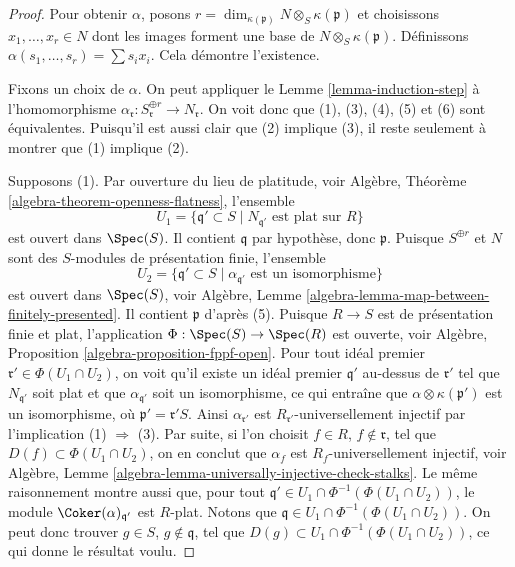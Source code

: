 \begin{proof}
Pour obtenir $\alpha$, posons
$r = \dim_{\kappa(\mathfrak p)} N \otimes_S \kappa(\mathfrak p)$ et choisissons
$x_1, \ldots, x_r \in N$ dont les images forment une base de
$N \otimes_S \kappa(\mathfrak p)$. Définissons
$\alpha(s_1, \ldots, s_r) = \sum s_i x_i$. Cela démontre l'existence.

\medskip\noindent
Fixons un choix de $\alpha$.
On peut appliquer
le Lemme \ref{lemma-induction-step}
à l'homomorphisme
$\alpha_{\mathfrak r} : S_{\mathfrak r}^{\oplus r} \to N_{\mathfrak r}$.
On voit donc que (1), (3), (4), (5) et (6) sont équivalentes.
Puisqu'il est aussi clair que (2) implique (3), il reste seulement
à montrer que (1) implique (2).

\medskip\noindent
Supposons (1). Par ouverture du lieu de platitude, voir
Algèbre, Théorème \ref{algebra-theorem-openness-flatness},
l'ensemble
$$
U_1 = \{\mathfrak q' \subset S \mid N_{\mathfrak q'}\text{ est plat sur }R\}
$$
est ouvert dans $\Spec(S)$. Il contient $\mathfrak q$ par hypothèse,
donc $\mathfrak p$. Puisque $S^{\oplus r}$ et $N$ sont des
$S$-modules de présentation finie, l'ensemble
$$
U_2 = \{\mathfrak q' \subset S \mid
\alpha_{\mathfrak q'}\text{ est un isomorphisme}\}
$$
est ouvert dans $\Spec(S)$, voir
Algèbre, Lemme \ref{algebra-lemma-map-between-finitely-presented}.
Il contient $\mathfrak p$ d'après (5). Puisque $R \to S$
est de présentation finie et plat, l'application
$\Phi : \Spec(S) \to \Spec(R)$ est ouverte, voir
Algèbre, Proposition \ref{algebra-proposition-fppf-open}.
Pour tout idéal premier $\mathfrak r' \in \Phi(U_1 \cap U_2)$, on voit
qu'il existe un idéal premier $\mathfrak q'$ au-dessus de $\mathfrak r'$ tel que
$N_{\mathfrak q'}$ soit plat et que $\alpha_{\mathfrak q'}$ soit
un isomorphisme, ce qui entraîne que $\alpha \otimes \kappa(\mathfrak p')$
est un isomorphisme, où $\mathfrak p' = \mathfrak r' S$. Ainsi
$\alpha_{\mathfrak r'}$ est $R_{\mathfrak r'}$-universellement injectif
par l'implication (1) $\Rightarrow$ (3).
Par suite, si l'on choisit $f \in R$, $f \not \in \mathfrak r$, tel que
$D(f) \subset \Phi(U_1 \cap U_2)$, on en conclut que
$\alpha_f$ est $R_f$-universellement injectif, voir
Algèbre, Lemme \ref{algebra-lemma-universally-injective-check-stalks}.
Le même raisonnement montre aussi que, pour tout
$\mathfrak q' \in U_1 \cap \Phi^{-1}(\Phi(U_1 \cap U_2))$,
le module $\Coker(\alpha)_{\mathfrak q'}$ est $R$-plat.
Notons que $\mathfrak q \in U_1 \cap \Phi^{-1}(\Phi(U_1 \cap U_2))$.
On peut donc trouver $g \in S$, $g \not \in \mathfrak q$, tel
que $D(g) \subset U_1 \cap \Phi^{-1}(\Phi(U_1 \cap U_2))$,
ce qui donne le résultat voulu.
\end{proof}

